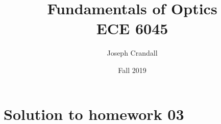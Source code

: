 

\usepackage{subfiles}
\usepackage{color,soul}
\usepackage{siunitx}
\usepackage{gensymb}

\title{Fundamentals of Optics\\
\large ECE 6045}
\author{Joseph Crandall}
\date{Fall 2019}


\maketitle

%

%

\section{Solution to homework 03}


%

%

%


